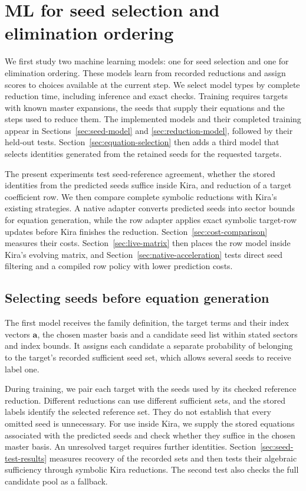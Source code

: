 \documentclass[11pt,a4paper]{article}
\begin{document}
\clearpage


\section{ML for seed selection and elimination ordering}
\label{sec:ml-roles}
We first study two machine learning
models: one for seed selection and one for elimination ordering.
These models learn from recorded reductions and assign scores to choices
available at the current step. We select model types by complete reduction
time, including inference and exact checks. Training requires targets with known master
expansions, the seeds that supply their equations and the steps used
to reduce them. The implemented models and their completed training
appear in Sections~\ref{sec:seed-model} and
\ref{sec:reduction-model}, followed by their held-out tests.
Section~\ref{sec:equation-selection} then adds a third model that
selects identities generated from the retained seeds for the requested targets.

The present experiments test seed-reference agreement, whether
the stored identities from the predicted seeds suffice inside Kira,
and reduction of a target coefficient row. We then compare complete
symbolic reductions with Kira's existing strategies. A native adapter
converts predicted seeds into sector bounds for equation generation,
while the row adapter applies exact symbolic target-row updates before
Kira finishes the reduction. Section~\ref{sec:cost-comparison} measures
their costs. Section~\ref{sec:live-matrix} then places the row model
inside Kira's evolving matrix, and Section~\ref{sec:native-acceleration}
tests direct seed filtering and a compiled row policy with lower
prediction costs.

\subsection{Selecting seeds before equation generation}
The first model receives the family definition, the target terms and
their index vectors $\boldsymbol a$, the chosen master basis and a
candidate seed list within stated sectors and index bounds. It
assigns each candidate a separate probability of belonging to the
target's recorded sufficient seed set, which allows several seeds
to receive label one.

During training, we pair each target with the seeds used by its
checked reference reduction. Different reductions can use different
sufficient sets, and the stored labels identify the selected reference
set. They do not establish that every omitted seed is unnecessary.
For use inside Kira, we supply the stored equations associated with
the predicted seeds and check whether they suffice in the chosen
master basis. An unresolved target requires further identities.
Section~\ref{sec:seed-test-results} measures recovery of the recorded
sets and then tests their algebraic sufficiency through symbolic
Kira reductions. The second test also checks the full candidate
pool as a fallback.
\end{document}
